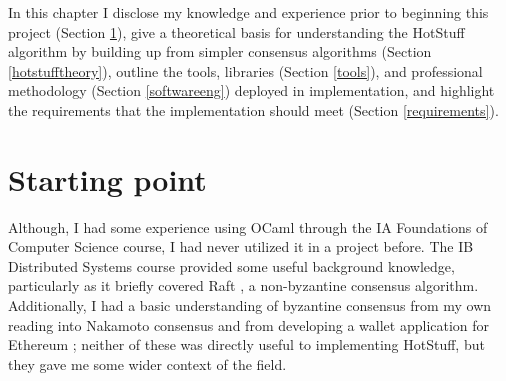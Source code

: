 



In this chapter I disclose my knowledge and experience prior to beginning this project (Section \ref{start}), give a theoretical basis for understanding the HotStuff algorithm by building up from simpler consensus algorithms (Section \ref{hotstufftheory}), outline the tools, libraries (Section \ref{tools}), and professional methodology (Section \ref{softwareeng}) deployed in implementation, and highlight the requirements that the implementation should meet (Section \ref{requirements}).

\section{Starting point} \label{start}
Although, I had some experience using OCaml through the IA Foundations of Computer Science course, I had never utilized it in a project before. The IB Distributed Systems course provided some useful background knowledge, particularly as it briefly covered Raft \cite{ongaroSearchUnderstandableConsensus2014}, a non-byzantine consensus algorithm. Additionally, I had a basic understanding of byzantine consensus from my own reading into Nakamoto consensus \cite{nakamotoBitcoinPeertoPeerElectronic2008} and from developing a wallet application for Ethereum \cite{ethereumWhite, ethereumYellow}; neither of these was directly useful to implementing HotStuff, but they gave me some wider context of the field.

